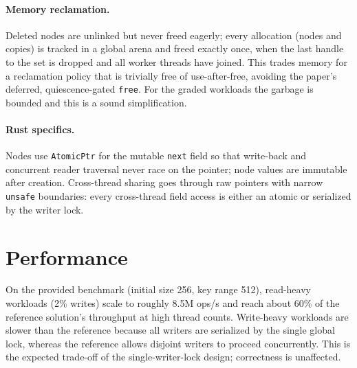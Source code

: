 \documentclass[11pt]{article}
\begin{document}
\paragraph{Memory reclamation.}
Deleted nodes are unlinked but never freed eagerly; every allocation (nodes and
copies) is tracked in a global arena and freed exactly once, when the last handle
to the set is dropped and all worker threads have joined. This trades memory for
a reclamation policy that is trivially free of use-after-free, avoiding the
paper's deferred, quiescence-gated \texttt{free}. For the graded workloads the
garbage is bounded and this is a sound simplification.

\paragraph{Rust specifics.}
Nodes use \texttt{AtomicPtr} for the mutable \texttt{next} field so that
write-back and concurrent reader traversal never race on the pointer; node values
are immutable after creation. Cross-thread sharing goes through raw pointers with
narrow \texttt{unsafe} boundaries: every cross-thread field access is either an
atomic or serialized by the writer lock.

\section*{Performance}

On the provided benchmark (initial size 256, key range 512), read-heavy workloads
(2\% writes) scale to roughly 8.5M ops/s and reach about 60\% of the reference
solution's throughput at high thread counts. Write-heavy workloads are slower
than the reference because all writers are serialized by the single global lock,
whereas the reference allows disjoint writers to proceed concurrently. This is
the expected trade-off of the single-writer-lock design; correctness is
unaffected.
\end{document}
